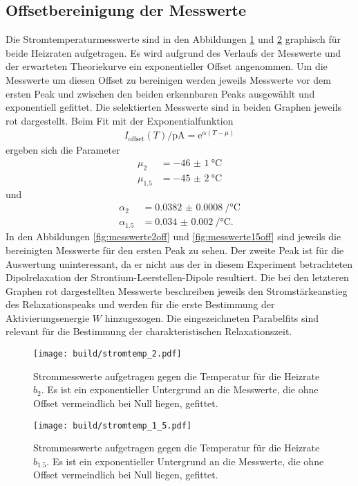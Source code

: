 \subsection{Offsetbereinigung der Messwerte}

Die Stromtemperaturmesswerte sind in den Abbildungen \ref{fig:messwerte2} und
\ref{fig:messwerte15} graphisch für beide Heizraten aufgetragen. Es wird
aufgrund des Verlaufs der Messwerte und der erwarteten Theoriekurve ein
exponentieller Offset angenommen. Um die Messwerte um diesen Offset zu bereinigen
werden jeweils Messwerte vor dem ersten Peak und zwischen den beiden erkennbaren
Peaks ausgewählt und exponentiell gefittet. Die selektierten Messwerte sind in beiden
Graphen jeweils rot dargestellt. Beim Fit mit der Exponentialfunktion
\begin{align}
  I_\text{offset}(T)/\si{\pico\ampere} = \mathrm{e}^{\alpha(T-\mu)}
\end{align}
ergeben sich die Parameter
\begin{align}
  \mu_{2} &= \SI{-46(1)}{\celsius} \\
  \mu_{1.5} &= \SI{-45(2)}{\celsius}
  \label{eqn:disk1}
\end{align}
und
\begin{align}
  \alpha_{2} &= \SI{0.0382(8)}{\per\celsius} \\
  \alpha_{1.5} &= \SI{0.034(2)}{\per\celsius}.
  \label{eqn:disk2}
\end{align}
In den Abbildungen \ref{fig:messwerte2off} und \ref{fig:messwerte15off} sind
jeweils die bereinigten Messwerte für den ersten Peak zu sehen. Der zweite Peak ist
für die Auswertung uninteressant, da er nicht aus der in diesem Experiment
betrachteten Dipolrelaxation der Strontium-Leerstellen-Dipole resultiert.
Die bei den letzteren Graphen rot dargestellten Messwerte beschreiben jeweils den
Stromstärkeanstieg des Relaxationspeaks und werden für die erste Bestimmung der
Aktivierungsenergie $W$ hinzugezogen. Die eingezeichneten Parabelfits sind relevant
für die Bestimmung der charakteristischen Relaxationszeit.

\begin{figure}
  \centering
  \texttt{[image: build/stromtemp\_2.pdf]}
  \caption{Strommesswerte aufgetragen gegen die Temperatur für die Heizrate $b_{2}$. Es ist ein exponentieller
  Untergrund an die Messwerte, die ohne Offset vermeindlich bei Null liegen, gefittet.}
  \label{fig:messwerte2}
\end{figure}

\begin{figure}
  \centering
  \texttt{[image: build/stromtemp\_1\_5.pdf]}
  \caption{Strommesswerte aufgetragen gegen die Temperatur für die Heizrate $b_{1.5}$. Es ist ein exponentieller
  Untergrund an die Messwerte, die ohne Offset vermeindlich bei Null liegen, gefittet.}
  \label{fig:messwerte15}
\end{figure}

